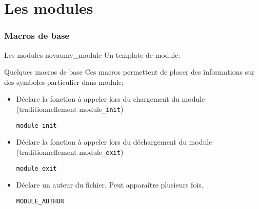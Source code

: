 %
%
%

\part{Les modules}

\begin{frame}
  \partpage
\end{frame}

\begin{frame}
  \tableofcontents[currentpart]
\end{frame}

\section{Macros de base}

\begin{frame}[fragile=singleslide]{Les modules noyau}{my\_module}
  Un template de module:
  
\end{frame}

\begin{frame}[fragile=singleslide]{Quelques macros de base}
  Ces macros  permettent de placer  des informations sur  des symboles
  particulier dans module;
  \begin{itemize} 
  \item Déclare  la fonction  à appeler lors  du chargement  du module
  (traditionnellement module\texttt{\_init})
    \begin{lstlisting} 
module_init
    \end{lstlisting} 
  \item Déclare la fonction à  appeler lors du déchargement du module
  (traditionnellement module\texttt{\_exit})
    \begin{lstlisting} 
module_exit
    \end{lstlisting} 
  \item Déclare un auteur du fichier. Peut apparaître plusieurs fois.
    \begin{lstlisting}
MODULE_AUTHOR
    \end{lstlisting}
  \end{itemize}
\end{frame}


